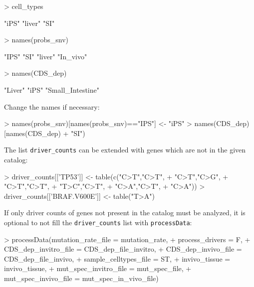 \documentclass{article}
\begin{document}
\begin{Schunk}
\begin{Sinput}
> cell_types
\end{Sinput}
\begin{Soutput}
[1] "iPS"   "liver" "SI"   
\end{Soutput}
\begin{Sinput}
> names(probs_snv)
\end{Sinput}
\begin{Soutput}
[1] "IPS"     "SI"      "liver"   "In_vivo"
\end{Soutput}
\begin{Sinput}
> names(CDS_dep)
\end{Sinput}
\begin{Soutput}
[1] "Liver"           "iPS"             "Small_Intestine"
\end{Soutput}
\end{Schunk}

Change the names if necessary:

\begin{Schunk}
\begin{Sinput}
> names(probs_snv)[names(probs_snv)=="IPS"] <- "iPS"
> names(CDS_dep)[names(CDS_dep) %
+                                                                       "SI")
\end{Sinput}
\end{Schunk}

The list \texttt{driver\_counts} can be extended with genes which are not in 
the given catalog:

\begin{Schunk}
\begin{Sinput}
> driver_counts[['TP53']] <- table(c("C>T","C>T",
+                                    "C>T","C>G",
+                                    "C>T","C>T",
+                                    "T>C","C>T",
+                                    "C>A","C>T",
+                                    "C>A"))
> driver_counts[['BRAF.V600E']] <- table("T>A")
\end{Sinput}
\end{Schunk}

If only driver counts of genes not present in the catalog must be analyzed, 
it is optional to not fill the \texttt{driver\_counts} list with 
\texttt{processData}: 

\begin{Schunk}
\begin{Sinput}
> processData(mutation_rate_file = mutation_rate,
+             process_drivers = F,
+             CDS_dep_invitro_file = CDS_dep_file_invitro,
+             CDS_dep_invivo_file = CDS_dep_file_invivo,
+             sample_celltypes_file = ST,
+             invivo_tissue = invivo_tissue,
+             mut_spec_invitro_file = mut_spec_file,
+             mut_spec_invivo_file = mut_spec_in_vivo_file)
\end{Sinput}
\end{Schunk}
\end{document}
